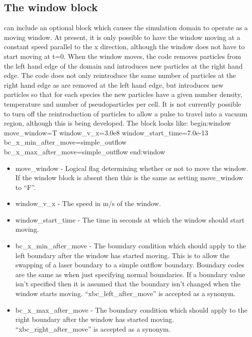 \documentclass[12pt,a4paper]{article}
\newcommand{\EPOCH}{{\color{warwickdark}\fontfamily{phv}\selectfont{EPOCH}}}
\newenvironment{boxverbatim}{\lboxverbatim{none}}{\endlboxverbatim}
\begin{document}
\subsection{The window block}
{\EPOCH} can include an optional block which causes the simulation domain to
operate as a moving window. At present, it is only possible to have the window
moving at a constant speed parallel to the x direction, although the window
does not have to start moving at t=0. When the window moves, the code removes
particles from the left hand edge of the domain and introduces new particles
at the right hand edge. The code does not only reintroduce the same number of
particles at the right hand edge as are removed at the left hand edge, but
introduces new particles so that for each species the new particles have a
given number density, temperature and number of pseudoparticles per cell. It
is not currently possible to turn off the reintroduction of particles to allow
a pulse to travel into a vacuum region, although this is being developed. The
block looks like:
\begin{boxverbatim}
begin:window
   move_window=T
   window_v_x=3.0e8
   window_start_time=7.0e-13
   bc_x_min_after_move=simple_outflow
   bc_x_max_after_move=simple_outflow
end:window
\end{boxverbatim}

\begin{itemize}
\item move\_window - Logical flag determining whether or not to move the
  window. If the window block is absent then this is the same as setting
  move\_window to ``F''.
\item window\_v\_x - The speed in m/s of the window.
\item window\_start\_time - The time in seconds at which the window should
  start moving.
\item bc\_x\_min\_after\_move - The boundary condition which should apply to
  the left boundary after the window has started moving. This is to allow the
  swapping of a laser boundary to a simple outflow boundary. Boundary codes
  are the same as when just specifying normal boundaries. If a boundary value
  isn't specified then it is assumed that the boundary isn't changed when the
  window starts moving. ``xbc\_left\_after\_move'' is accepted as a synonym.
\item bc\_x\_max\_after\_move - The boundary condition which should apply to
  the right boundary after the window has started moving.
  ``xbc\_right\_after\_move'' is accepted as a synonym.
\end{itemize}
\end{document}
